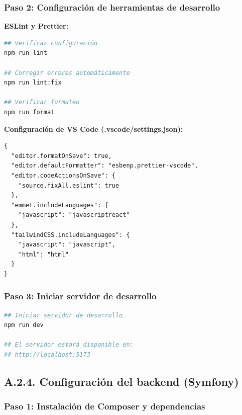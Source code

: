 \documentclass[12pt,a4paper,oneside]{report}
\begin{document}
\subsubsection{Paso 2: Configuración de herramientas de
desarrollo}\label{paso-2-configuraciuxf3n-de-herramientas-de-desarrollo}

\textbf{ESLint y Prettier:}

\begin{lstlisting}[language=bash]
## Verificar configuración
npm run lint

## Corregir errores automáticamente
npm run lint:fix

## Verificar formateo
npm run format
\end{lstlisting}

\textbf{Configuración de VS Code (.vscode/settings.json):}

\begin{lstlisting}
{
  "editor.formatOnSave": true,
  "editor.defaultFormatter": "esbenp.prettier-vscode",
  "editor.codeActionsOnSave": {
    "source.fixAll.eslint": true
  },
  "emmet.includeLanguages": {
    "javascript": "javascriptreact"
  },
  "tailwindCSS.includeLanguages": {
    "javascript": "javascript",
    "html": "html"
  }
}
\end{lstlisting}

\subsubsection{Paso 3: Iniciar servidor de
desarrollo}\label{paso-3-iniciar-servidor-de-desarrollo}

\begin{lstlisting}[language=bash]
## Iniciar servidor de desarrollo
npm run dev

## El servidor estará disponible en:
## http://localhost:5173
\end{lstlisting}

\subsection{A.2.4. Configuración del backend
(Symfony)}\label{a.2.4.-configuraciuxf3n-del-backend-symfony}

\subsubsection{Paso 1: Instalación de Composer y
dependencias}\label{paso-1-instalaciuxf3n-de-composer-y-dependencias}
\end{document}
